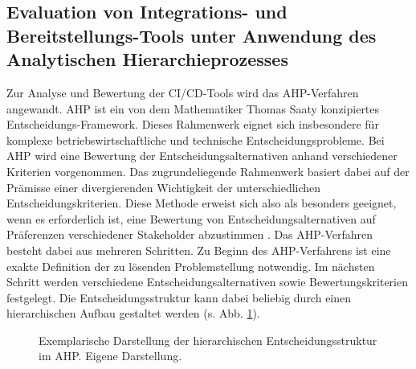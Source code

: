 \subsection{Evaluation von Integrations- und Bereitstellungs-Tools unter Anwendung des Analytischen Hierarchieprozesses}
\label{sec:meth_ahp}
Zur Analyse und Bewertung der CI/CD-Tools wird das AHP-Verfahren angewandt. 
AHP ist ein von dem Mathematiker Thomas Saaty konzipiertes Entscheidungs-Framework. Dieses Rahmenwerk eignet sich insbesondere für komplexe betriebswirtschaftliche und technische Entscheidungsprobleme. Bei AHP wird eine Bewertung der Entscheidungsalternativen anhand verschiedener Kriterien vorgenommen. Das zugrundeliegende Rahmenwerk basiert dabei auf der Prämisse einer divergierenden Wichtigkeit der unterschiedlichen Entscheidungskriterien. Diese Methode erweist sich also als besonders geeignet, wenn es erforderlich ist, eine Bewertung von Entscheidungsalternativen auf Präferenzen verschiedener Stakeholder abzustimmen \cite[86]{Saaty.2008}. Das AHP-Verfahren besteht dabei aus mehreren Schritten. Zu Beginn des AHP-Verfahrens ist eine exakte Definition der zu lösenden Problemstellung notwendig. Im nächsten Schritt werden verschiedene Entscheidungsalternativen sowie Bewertungskriterien festgelegt. Die Entscheidungsstruktur kann dabei beliebig durch einen hierarchischen Aufbau gestaltet werden (s. Abb. \ref{fig:AHP_B}). 
\begin{center}
	\begin{figure}[H]
		\centering
		\caption[Exemplarische Darstellung der hierarchischen Entscheidungsstruktur im AHP]{Exemplarische Darstellung der hierarchischen Entscheidungsstruktur im AHP. Eigene Darstellung.}
		\label{fig:AHP_B}
	\end{figure}
\end{center}
\vspace*{-10mm}
